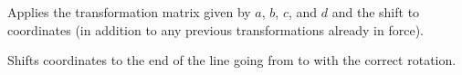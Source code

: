 \begin{command}{\pgftransformcm{}}
    Applies the transformation matrix given by $a$, $b$, $c$, and $d$ and the
    shift  to coordinates (in addition to any previous
    transformations already in force).
\begin{codeexample}[]
\end{codeexample}
\end{command}

\begin{command}{\pgftransformarrow{}}
    Shifts coordinates to the end of the line going from  to
     with the correct rotation.
\begin{codeexample}[]
\end{codeexample}
\end{command}

